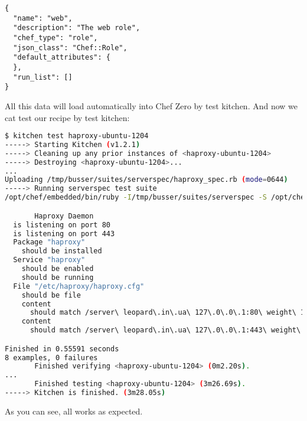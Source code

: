 \begin{lstlisting}[label=lst:testing-chef-zero22]
{
  "name": "web",
  "description": "The web role",
  "chef_type": "role",
  "json_class": "Chef::Role",
  "default_attributes": {
  },
  "run_list": []
}
\end{lstlisting}

All this data will load automatically into Chef Zero by test kitchen. And now we cat test our recipe by test kitchen:

\begin{lstlisting}[language=Bash,label=lst:testing-chef-zero23]
$ kitchen test haproxy-ubuntu-1204
-----> Starting Kitchen (v1.2.1)
-----> Cleaning up any prior instances of <haproxy-ubuntu-1204>
-----> Destroying <haproxy-ubuntu-1204>...
...
Uploading /tmp/busser/suites/serverspec/haproxy_spec.rb (mode=0644)
-----> Running serverspec test suite
/opt/chef/embedded/bin/ruby -I/tmp/busser/suites/serverspec -S /opt/chef/embedded/bin/rspec /tmp/busser/suites/serverspec/haproxy_spec.rb --color --format documentation

       Haproxy Daemon
  is listening on port 80
  is listening on port 443
  Package "haproxy"
    should be installed
  Service "haproxy"
    should be enabled
    should be running
  File "/etc/haproxy/haproxy.cfg"
    should be file
    content
      should match /server\ leopard\.in\.ua\ 127\.0\.0\.1:80\ weight\ 1\ maxconn\ 1024\ check/
    content
      should match /server\ leopard\.in\.ua\ 127\.0\.0\.1:443\ weight\ 1\ maxconn\ 1024\ check/

Finished in 0.55591 seconds
8 examples, 0 failures
       Finished verifying <haproxy-ubuntu-1204> (0m2.20s).
...
       Finished testing <haproxy-ubuntu-1204> (3m26.69s).
-----> Kitchen is finished. (3m28.05s)
\end{lstlisting}

As you can see, all works as expected.